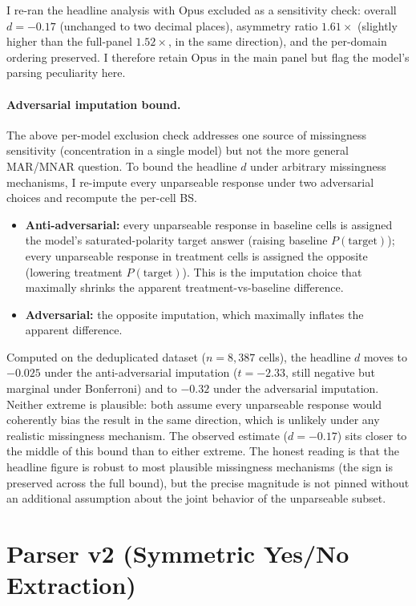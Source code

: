 \documentclass[10pt,twocolumn]{article}
\begin{document}
I re-ran the headline analysis with Opus excluded as a sensitivity check: overall $d = -0.17$ (unchanged to two decimal places), asymmetry ratio $1.61\times$ (slightly higher than the full-panel $1.52\times$, in the same direction), and the per-domain ordering preserved.
I therefore retain Opus in the main panel but flag the model's parsing peculiarity here.

\paragraph{Adversarial imputation bound.}
The above per-model exclusion check addresses one source of missingness sensitivity (concentration in a single model) but not the more general MAR/MNAR question. To bound the headline $d$ under arbitrary missingness mechanisms, I re-impute every unparseable response under two adversarial choices and recompute the per-cell BS.

\begin{itemize}
    \item \textbf{Anti-adversarial:} every unparseable response in baseline cells is assigned the model's saturated-polarity target answer (raising baseline $P(\text{target})$); every unparseable response in treatment cells is assigned the opposite (lowering treatment $P(\text{target})$). This is the imputation choice that maximally shrinks the apparent treatment-vs-baseline difference.

    \item \textbf{Adversarial:} the opposite imputation, which maximally inflates the apparent difference.
\end{itemize}

Computed on the deduplicated dataset ($n = 8{,}387$ cells), the headline $d$ moves to $-0.025$ under the anti-adversarial imputation ($t = -2.33$, still negative but marginal under Bonferroni) and to $-0.32$ under the adversarial imputation. Neither extreme is plausible: both assume every unparseable response would coherently bias the result in the same direction, which is unlikely under any realistic missingness mechanism. The observed estimate ($d = -0.17$) sits closer to the middle of this bound than to either extreme. The honest reading is that the headline figure is robust to most plausible missingness mechanisms (the sign is preserved across the full bound), but the precise magnitude is not pinned without an additional assumption about the joint behavior of the unparseable subset.

\section{Parser v2 (Symmetric Yes/No Extraction)}
\label{app:parser}
\end{document}
